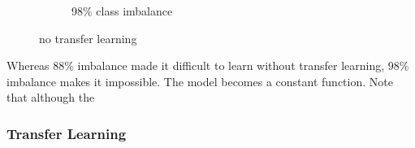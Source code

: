 \documentclass[a4paper,11pt]{article}
\begin{document}
\begin{figure}
\begin{minipage}[b]{\textwidth}
\begin{subfigure}{.5\textwidth}
        \caption{98\% class imbalance}\label{fig:2b}
      \end{subfigure} \par \vspace*{20pt} %
      \caption{no transfer learning}\label{fig:2}
    \end{minipage}%
\end{figure}

Whereas 88\% imbalance made it difficult to learn without transfer learning, 98\% imbalance makes it impossible. The model becomes a constant function. Note that although the 

\subsubsection{Transfer Learning}
\end{document}
